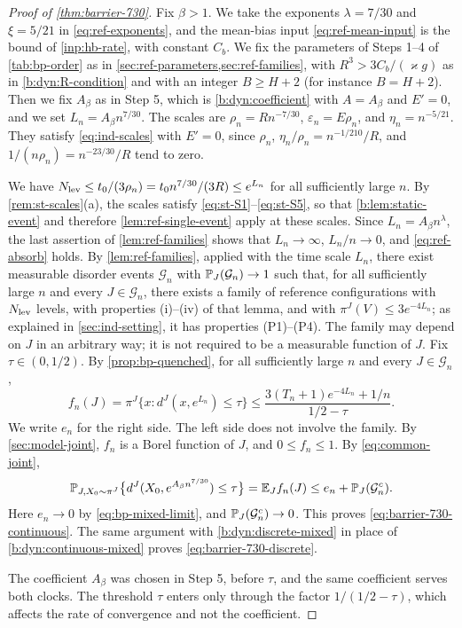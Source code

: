 \begin{proof}[Proof of \cref{thm:barrier-730}]
Fix $\beta>1$. We take the exponents $\lambda=7/30$ and $\xi=5/21$ in \eqref{eq:ref-exponents}, and the mean-bias input \eqref{eq:ref-mean-input} is the bound of \cref{inp:hb-rate}, with constant $C_b$. We fix the parameters of Steps 1--4 of \cref{tab:bp-order} as in \cref{sec:ref-parameters,sec:ref-families}, with $R^3>3C_b/(\varkappa g)$ as in \eqref{b:dyn:R-condition} and with an integer $B\ge H+2$ (for instance $B=H+2$). Then we fix $A_\beta$ as in Step 5, which is \eqref{b:dyn:coefficient} with $A=A_\beta$ and $E'=0$, and we set $L_n=A_\beta n^{7/30}$. The scales are $\rho_n=Rn^{-7/30}$, $\varepsilon_n=E\rho_n$, and $\eta_n=n^{-5/21}$. They satisfy \eqref{eq:ind-scales} with $E'=0$, since $\rho_n$, $\eta_n/\rho_n=n^{-1/210}/R$, and $1/(n\rho_n)=n^{-23/30}/R$ tend to zero.

We have $N_{\rm lev}\le t_0/(3\rho_n)=t_0n^{7/30}/(3R)\le e^{L_n}$ for all sufficiently large $n$. By \cref{rem:st-scales}(a), the scales satisfy \eqref{eq:st-S1}--\eqref{eq:st-S5}, so that \cref{b:lem:static-event} and therefore \cref{lem:ref-single-event} apply at these scales. Since $L_n=A_\beta n^{\lambda}$, the last assertion of \cref{lem:ref-families} shows that $L_n\to\infty$, $L_n/n\to0$, and \eqref{eq:ref-absorb} holds. By \cref{lem:ref-families}, applied with the time scale $L_n$, there exist measurable disorder events $\mathcal G_n$ with $\mathbb P_J(\mathcal G_n)\to1$ such that, for all sufficiently large $n$ and every $J\in\mathcal G_n$, there exists a family of reference configurations with $N_{\rm lev}$ levels, with properties (i)--(iv) of that lemma, and with $\pi^J(V)\le3e^{-4L_n}$; as explained in \cref{sec:ind-setting}, it has properties (P1)--(P4). The family may depend on $J$ in an arbitrary way; it is not required to be a measurable function of $J$. Fix $\tau\in(0,1/2)$. By \cref{prop:bp-quenched}, for all sufficiently large $n$ and every $J\in\mathcal G_n$,
\[
 f_n(J)=\pi^J\bigl\{x:d^J(x,e^{L_n})\le\tau\bigr\}\le\frac{3(T_n+1)e^{-4L_n}+1/n}{1/2-\tau}.
\]
We write $e_n$ for the right side. The left side does not involve the family. By \cref{sec:model-joint}, $f_n$ is a Borel function of $J$, and $0\le f_n\le1$. By \eqref{eq:common-joint},
\[
 \mathbb P_{J,X_0\sim\pi^J}\bigl\{d^J(X_0,e^{A_\beta n^{7/30}})\le\tau\bigr\}=\mathbb E_Jf_n(J)\le e_n+\mathbb P_J(\mathcal G_n^c).
\]
Here $e_n\to0$ by \eqref{eq:bp-mixed-limit}, and $\mathbb P_J(\mathcal G_n^c)\to0$. This proves \eqref{eq:barrier-730-continuous}. The same argument with \eqref{b:dyn:discrete-mixed} in place of \eqref{b:dyn:continuous-mixed} proves \eqref{eq:barrier-730-discrete}.

The coefficient $A_\beta$ was chosen in Step 5, before $\tau$, and the same coefficient serves both clocks. The threshold $\tau$ enters only through the factor $1/(1/2-\tau)$, which affects the rate of convergence and not the coefficient.
\end{proof}

